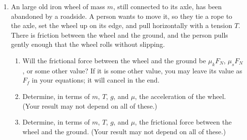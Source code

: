 \documentclass[12pt]{article}
\begin{document}
\begin{enumerate}
\bigskip
%
%
%
%
%
%

\item An large old iron wheel of mass $m$, still connected to its axle, has been abandoned by a roadside. A person wants to move it, so they tie a rope to the axle, set the wheel up on its edge, and pull horizontally with a tension $T$. There is friction between the wheel and the ground, and the person 
	pulls gently enough that the wheel rolls without slipping.

\begin{enumerate}
	\item Will the frictional force between the wheel and the ground be $\mu_k F_N$, $\mu_s F_N$, or some other value? If it is some other value, you may leave its value as $F_f$ in your equations; 
		it will cancel in the end.

	\item Determine, in terms of $m$, $T$, $g$, and $\mu$, the acceleration of the wheel. (Your result may not depend on all of these.)
	
	\item Determine, in terms of $m$, $T$, $g$, and $\mu$, the frictional force between the wheel and the ground. (Your result may not depend on all of these.)	
\end{enumerate}

\newpage


\end{enumerate}
\end{document}

